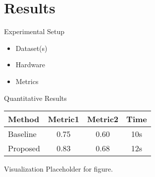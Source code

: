 \section{Results}

\begin{frame}{Experimental Setup}
  \begin{itemize}
    \item Dataset(s)
    \item Hardware
    \item Metrics
  \end{itemize}
\end{frame}

\begin{frame}{Quantitative Results}
  \begin{tabular}{lccc}
    \toprule
    Method & Metric1 & Metric2 & Time \\
    \midrule
    Baseline & 0.75 & 0.60 & 10s \\
    Proposed & 0.83 & 0.68 & 12s \\
    \bottomrule
  \end{tabular}
\end{frame}

\begin{frame}{Visualization}
  \centering
  Placeholder for figure.
\end{frame}
